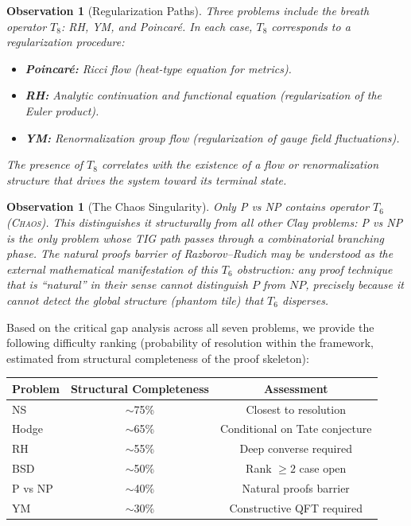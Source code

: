 \documentclass[11pt]{article}
\newtheorem{observation}[theorem]{Observation}
\begin{document}
\begin{observation}[Regularization Paths]
Three problems include the breath operator $T_8$: RH, YM, and
Poincar\'e.  In each case, $T_8$ corresponds to a regularization
procedure:
\begin{itemize}
\item \textbf{Poincar\'e:} Ricci flow (heat-type equation for metrics).
\item \textbf{RH:} Analytic continuation and functional equation
(regularization of the Euler product).
\item \textbf{YM:} Renormalization group flow (regularization of
gauge field fluctuations).
\end{itemize}
The presence of $T_8$ correlates with the existence of a flow or
renormalization structure that drives the system toward its terminal
state.
\end{observation}

\begin{observation}[The Chaos Singularity]
Only P vs NP contains operator $T_6$ (\textsc{Chaos}).  This
distinguishes it structurally from all other Clay problems: P vs NP
is the only problem whose TIG path passes through a combinatorial
branching phase.  The natural proofs barrier of Razborov--Rudich
\cite{RR} may be understood as the external mathematical manifestation
of this $T_6$ obstruction: any proof technique that is ``natural'' in
their sense cannot distinguish $P$ from $NP$, precisely because it
cannot detect the global structure (phantom tile) that $T_6$
disperses.
\end{observation}

Based on the critical gap analysis across all seven problems, we
provide the following difficulty ranking (probability of resolution
within the framework, estimated from structural completeness of the
proof skeleton):

\begin{center}
\begin{tabular}{@{}lcc@{}}
\toprule
Problem & Structural Completeness & Assessment \\
\midrule
NS & $\sim$75\% & Closest to resolution \\
Hodge & $\sim$65\% & Conditional on Tate conjecture \\
RH & $\sim$55\% & Deep converse required \\
BSD & $\sim$50\% & Rank $\geq 2$ case open \\
P vs NP & $\sim$40\% & Natural proofs barrier \\
YM & $\sim$30\% & Constructive QFT required \\
\bottomrule
\end{tabular}
\end{center}
\end{document}

